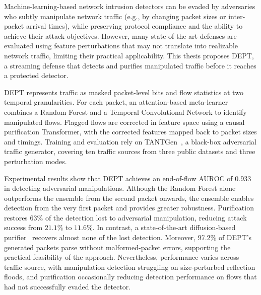 \acresetall
\noindent Machine-learning-based network intrusion detectors can be evaded by adversaries who subtly manipulate network traffic (e.g., by changing packet sizes or inter-packet arrival times), while preserving protocol compliance and the ability to achieve their attack objectives.
However, many state-of-the-art defenses are evaluated using feature perturbations that may not translate into realizable network traffic, limiting their practical applicability.
This thesis proposes DEPT, a streaming defense that detects and purifies manipulated traffic before it reaches a protected detector.

DEPT represents traffic as masked packet-level bits and flow statistics at two temporal granularities.
For each packet, an attention-based meta-learner combines a Random Forest and a Temporal Convolutional Network to identify manipulated flows.
Flagged flows are corrected in feature space using a causal purification Transformer, with the corrected features mapped back to packet sizes and timings.
Training and evaluation rely on TANTGen~\cite{pissarra2026tantgen}, a black-box adversarial traffic generator, covering ten traffic sources from three public datasets and three perturbation modes.

Experimental results show that DEPT achieves an end-of-flow AUROC of $0.933$ in detecting adversarial manipulations.
Although the Random Forest alone outperforms the ensemble from the second packet onwards, the ensemble enables detection from the very first packet and provides greater robustness.
Purification restores $63\%$ of the detection lost to adversarial manipulation, reducing attack success from $21.1\%$ to $11.6\%$.
In contrast, a state-of-the-art diffusion-based purifier~\cite{merzouk2024diffusion} recovers almost none of the lost detection.
Moreover, $97.2\%$ of DEPT's generated packets parse without malformed-packet errors, supporting the practical feasibility of the approach.
Nevertheless, performance varies across traffic source, with manipulation detection struggling on size-perturbed reflection floods, and purification occasionally reducing detection performance on flows that had not successfully evaded the detector.
